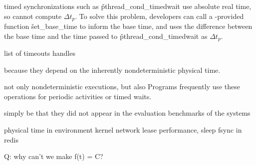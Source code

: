 \pthread timed synchronizations such as \v{pthread\_cond\_timedwait} use
absolute real time, so \xxx cannot compute $\Delta t_p$.  To solve this
problem, developers can call a \xxx-provided function \v{set\_base\_time}
to inform \xxx the base time, and \xxx uses the difference between the
base time and the time passed to \v{pthread\_cond\_timedwait} as $\Delta
t_p$.

list of timeouts \xxx handles

because they depend on the inherently nondeterministic physical time.




not only nondeterministic executions, but also
Programs frequently use these operations for periodic activities or timed
waits.

simply be that they did not appear in the evaluation benchmarks of the systems


  physical time in environment
    kernel
    network lease
  performance, sleep fsync in redis

  Q: why can't we make f(t) = C?

